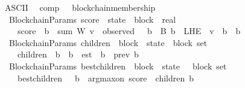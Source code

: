 \begin{isabellebody}
\isanewline
{}\isamarkupfalse%
\ {\isacharparenleft}ASCII{\isacharparenright}\isanewline
\ \ comp\ \ {\isacharparenleft}\ {\isachardoublequoteopen}blockchain{\isacharunderscore}membership{\isachardoublequoteclose}\ {}{}{\isacharparenright}\isanewline
\isanewline
\isanewline
{}\isamarkupfalse%
\ {\isacharparenleft}\ BlockchainParams{\isacharparenright}\ score\ {\isacharcolon}{\isacharcolon}\ {\isachardoublequoteopen}state\ {\isasymRightarrow}\ block\ {\isasymRightarrow}\ real{\isachardoublequoteclose}\isanewline
\ \ \isanewline
\ \ \ \ {\isachardoublequoteopen}score\ {\isasymsigma}\ b\ {\isacharequal}\ sum\ W\ {\isacharbraceleft}v\ {\isasymin}\ observed\ {\isasymsigma}{\isachardot}\ {\isasymexists}\ b{\isacharprime}\ {\isasymin}\ B{\isachardot}\ b{\isacharprime}\ {\isasymin}\ {\isacharparenleft}L{\isacharunderscore}H{\isacharunderscore}E\ {\isasymsigma}\ v{\isacharparenright}\ {\isasymand}\ {\isacharparenleft}b\ {\isasymdownharpoonright}\ b{\isacharprime}{\isacharparenright}{\isacharbraceright}{\isachardoublequoteclose}\isanewline
\isanewline
\isanewline
{}\isamarkupfalse%
\ {\isacharparenleft}\ BlockchainParams{\isacharparenright}\ children\ {\isacharcolon}{\isacharcolon}\ {\isachardoublequoteopen}block\ {\isacharasterisk}\ state\ {\isasymRightarrow}\ block\ set{\isachardoublequoteclose}\isanewline
\ \ \isanewline
\ \ \ \ {\isachardoublequoteopen}children\ {\isacharequal}\ {\isacharparenleft}{\isasymlambda}{\isacharparenleft}b{\isacharcomma}\ {\isasymsigma}{\isacharparenright}{\isachardot}\ {\isacharbraceleft}b{\isacharprime}\ {\isasymin}\ est\ {\isacharbackquote}{\isasymsigma}{\isachardot}\ b\ {\isacharequal}\ prev\ b{\isacharprime}{\isacharbraceright}{\isacharparenright}{\isachardoublequoteclose}\isanewline
\isanewline
\isanewline
{}\isamarkupfalse%
\ {\isacharparenleft}\ BlockchainParams{\isacharparenright}\ best{\isacharunderscore}children\ {\isacharcolon}{\isacharcolon}\ {\isachardoublequoteopen}block\ {\isacharasterisk}\ state\ {\isasymRightarrow}\ \ block\ set{\isachardoublequoteclose}\isanewline
\ \ \isanewline
\ \ \ \ {\isachardoublequoteopen}best{\isacharunderscore}children\ {\isacharequal}\ {\isacharparenleft}{\isasymlambda}\ {\isacharparenleft}b{\isacharcomma}\ {\isasymsigma}{\isacharparenright}{\isachardot}\ {\isacharbraceleft}arg{\isacharunderscore}max{\isacharunderscore}on\ {\isacharparenleft}score\ {\isasymsigma}{\isacharparenright}\ {\isacharparenleft}children\ {\isacharparenleft}b{\isacharcomma}\ {\isasymsigma}{\isacharparenright}{\isacharparenright}{\isacharbraceright}{\isacharparenright}{\isachardoublequoteclose}\isanewline

\end{isabellebody}
